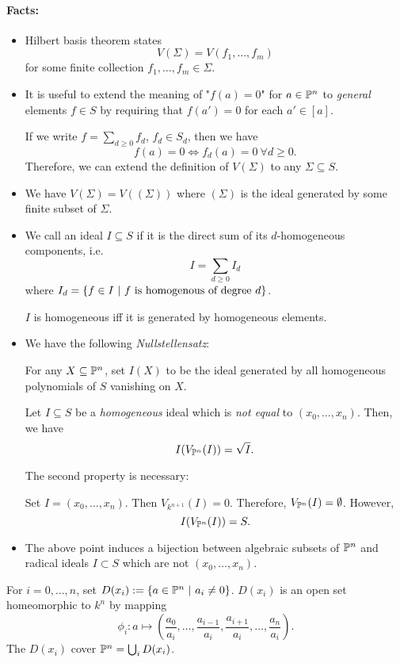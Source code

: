 \paragraph{Facts:}
\begin{itemize}
	\item Hilbert basis theorem states
	\[ V(\Sigma) = V(f_1, \ldots, f_m) \]
	for some finite collection $f_1,\ldots, f_m \in \Sigma$.
	\item It is useful to extend the meaning of "$f(a) = 0$" for $a \in \P^n$ to \emph{general} elements $f \in S$ by requiring that $f(a') = 0$ for each $a' \in [a]$.
	
	If we write $f = \sum_{d \geq 0} f_d$, $f_d \in S_d$, then we have
	\[ f(a) = 0 \iff f_d(a) = 0 ~ \forall d \geq 0. \]
	Therefore, we can extend the definition of $V(\Sigma)$ to any $\Sigma \subseteq S$.
	\item We have $V(\Sigma) = V((\Sigma))$ where $(\Sigma)$ is the ideal generated by some finite subset of $\Sigma$.
	\item We call an ideal $I \subseteq S$  if it is the direct sum of its $d$-homogeneous components, i.e.
	\[ I = \sum_{d \geq 0}I_d \]
	where $I_d = \set{f \in I}{f \text{ is homogenous of degree }d}$.
	
	$I$ is homogeneous iff it is generated by homogeneous elements.
	\item We have the following \emph{Nullstellensatz}:
	
	For any $X \subseteq \P^n$, set $I(X)$ to be the ideal generated by all homogeneous polynomials of $S$ vanishing on $X$.
	
	Let $I \subseteq S$ be a \emph{homogeneous} ideal which is \emph{not equal} to $(x_0, \ldots, x_n)$. Then, we have
	\[ I(V_{\P^n}(I)) = \sqrt{I}. \]
\begin{example}
	The second property is necessary:
	
Set $I = (x_0, \ldots, x_n)$. Then $V_{k^{n+1}}(I) = 0$. Therefore, $V_{\P^n}(I) = \emptyset$. However,
\[ I(V_{\P^n}(I)) = S. \]
\end{example}
\item The above point induces a bijection between algebraic subsets of $\P^n$ and radical ideals $I \subset S$ which are not $(x_0,\ldots, x_n)$.
\end{itemize}

For $i = 0,\ldots, n$, set $D(x_i) := \set{a \in \P^n}{a_i \neq 0}$. $D(x_i)$ is an open set homeomorphic to $k^n$ by mapping
\[ \phi_i : a \longmapsto (\frac{a_0}{a_i}, \ldots,\frac{a_{i-1}}{a_i},\frac{a_{i+1}}{a_i},\ldots, \frac{a_{n}}{a_i} ). \]
The $D(x_i)$ cover $\P^n = \bigcup_i D(x_i)$.

